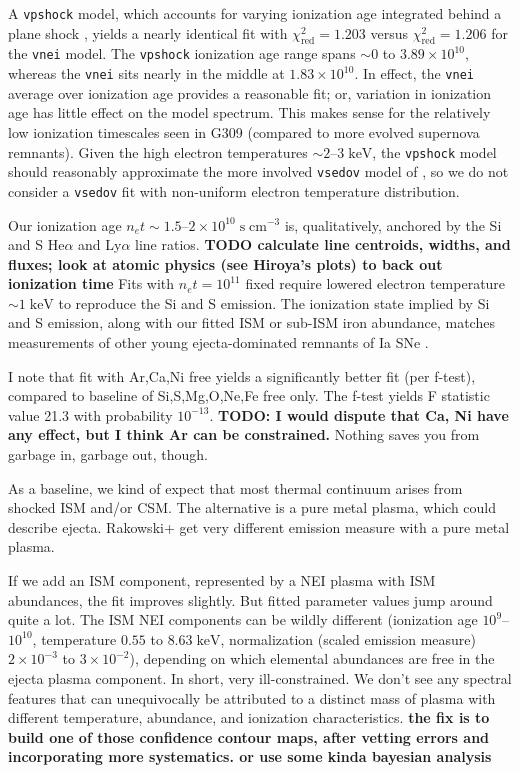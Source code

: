 \documentclass[preprint2,tighten,trackchanges]{aastex6}
\newcommand*{\mt}{\mathrm}
\newcommand*{\unit}[1]{\;\mt{#1}}  %
\newcommand*{\abt}{\mathord{\sim}} %
\begin{document}
A \texttt{vpshock} model, which accounts for varying ionization age integrated
behind a plane shock \citep{borkowski2001}, yields a nearly identical fit with
$\chi^2_{\mt{red}} = 1.203$ versus $\chi^2_{\mt{red}} = 1.206$ for the
\texttt{vnei} model.
The \texttt{vpshock} ionization age range spans
$\abt 0$ to $3.89 \times 10^{10}$, whereas the \texttt{vnei} sits nearly in the
middle at $1.83 \times 10^{10}$.
In effect, the \texttt{vnei} average over ionization age provides a reasonable
fit; or, variation in ionization age has little effect on the model spectrum.
This makes sense for the relatively low ionization timescales seen in G309
(compared to more evolved supernova remnants).
Given the high electron temperatures $\abt 2$--$3 \unit{keV}$, the
\texttt{vpshock} model should reasonably approximate the more involved
\texttt{vsedov} model of \citet{borkowski2001}, so we do not consider a
\texttt{vsedov} fit with non-uniform electron temperature distribution.

Our ionization age $n_e t \sim 1.5$--$2 \times 10^{10} \unit{s\;cm^{-3}}$
is, qualitatively, anchored by the Si and S He$\alpha$ and Ly$\alpha$ line ratios.
\textbf{TODO calculate line centroids, widths, and fluxes; look at atomic
physics (see Hiroya's plots) to back out ionization time}
Fits with $n_e t = 10^{11}$ fixed require lowered
electron temperature $\sim 1 \unit{keV}$ to reproduce the Si and S emission.
The ionization state implied by Si and S emission, along with our fitted ISM or
sub-ISM iron abundance, matches measurements of other young ejecta-dominated
remnants of Ia SNe \citep[][Table 4]{badenes2007}.

I note that fit with Ar,Ca,Ni free yields a significantly better fit (per
f-test), compared to baseline of Si,S,Mg,O,Ne,Fe free only.
The f-test yields F statistic value 21.3 with probability $10^{-13}$.
\textbf{TODO: I would dispute that Ca, Ni have any effect, but I think Ar can be constrained.}
Nothing saves you from garbage in, garbage out, though.

As a baseline, we kind of expect that most thermal continuum arises from
shocked ISM and/or CSM.
The alternative is a pure metal plasma, which could describe ejecta.
Rakowski+ get very different emission measure with a pure metal plasma.

If we add an ISM component, represented by a NEI plasma with ISM abundances,
the fit improves slightly.
But fitted parameter values jump around quite a lot.
The ISM NEI components can be wildly different (ionization age
$10^{9}$--$10^{10}$, temperature $0.55$ to $8.63 \unit{keV}$,
normalization (scaled emission measure) $2 \times 10^{-3}$ to $3 \times
10^{-2}$), depending on which elemental abundances are free in the ejecta
plasma component.  In short, very ill-constrained.
We don't see any spectral features that can unequivocally be attributed to a
distinct mass of plasma with different temperature, abundance, and ionization
characteristics.
\textbf{the fix is to build one of those confidence contour maps,
after vetting errors and incorporating more systematics.
or use some kinda bayesian analysis}
\end{document}
